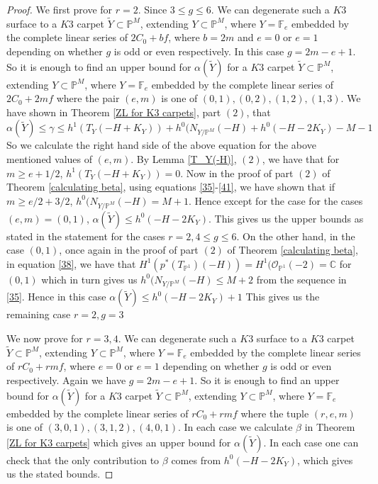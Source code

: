 \documentclass[11pt,twoside]{amsart}
\theoremstyle{plain}
\numberwithin{equation}{section}
\theoremstyle{definition}
\begin{document}
\begin{proof}
We first prove for $r = 2$. Since $3 \leq g \leq 6$. We can degenerate such a $K3$ surface to a $K3$ carpet $\widetilde{Y} \subset \mathbb{P}^M$, extending $Y \subset \mathbb{P}^M$, where $Y = \mathbb{F}_e$ embedded by the complete linear series of $2C_0+bf$, where $b = 2m$ and $e = 0$ or $e = 1$ depending on whether $g$ is odd or even respectively. In this case $g = 2m-e+1$. So it is enough to find an upper bound for $\alpha(\widetilde{Y})$ for a $K3$ carpet $\widetilde{Y} \subset \mathbb{P}^M$, extending $Y \subset \mathbb{P}^M$, where $Y = \mathbb{F}_e$ embedded by the complete linear series of $2C_0+2mf$ where the pair $(e,m)$ is one of $(0,1), (0,2), (1,2), (1,3)$. We have shown in Theorem \ref{ZL for K3 carpets}, part $(2)$, that $$\alpha(\widetilde{Y})  \leq  \gamma \leq h^1(T_Y(-H+K_Y))+h^0(N_{Y/\mathbb{P}^M}(-H)+h^0(-H-2K_Y)-M-1 $$
So we calculate the right hand side of the above equation for the above mentioned values of $(e,m)$. By Lemma \ref{T_Y(-H)}, $(2)$, we have that for $m \geq e+1/2$, $h^1(T_Y(-H+K_Y)) = 0$. Now in the proof of part $(2)$ of Theorem \ref{calculating beta}, using equations \ref{35}-\ref{41}, we have shown that if $m \geq e/2+3/2$, $h^0(N_{Y/\mathbb{P}^M}(-H) = M+1$. Hence except for the case for the cases $(e,m) = (0,1)$, $\alpha(\widetilde{Y}) \leq h^0(-H-2K_Y)$. This gives us the upper bounds as stated in the statement for the cases $r = 2, 4 \leq g \leq 6$. On the other hand, in the case $(0,1)$, once again in the proof of part $(2)$ of Theorem \ref{calculating beta}, in equation \ref{38}, we have that $H^1(p^*(T_{\mathbb{P}^1})(-H)) = H^1(\mathcal{O}_{\mathbb{P}^1}(-2) = \mathbb{C}$ for $(0,1)$ 
which in turn gives us $h^0(N_{Y/\mathbb{P}^M}(-H) \leq M+2$ 
from the sequence in \ref{35}. Hence in this case $\alpha(\widetilde{Y}) \leq h^0(-H-2K_Y)+1$ 
This gives us the remaining case $r = 2, g = 3$ 

We now prove for $r = 3,4$. We can degenerate such a $K3$ surface to a $K3$ carpet $\widetilde{Y} \subset \mathbb{P}^M$, extending $Y \subset \mathbb{P}^M$, where $Y = \mathbb{F}_e$ embedded by the complete linear series of $rC_0+rmf$, where $e = 0$ or $e = 1$ depending on whether $g$ is odd or even respectively. Again we have $g = 2m-e+1$. So it is enough to find an upper bound for $\alpha(\widetilde{Y})$ for a $K3$ carpet $\widetilde{Y} \subset \mathbb{P}^M$, extending $Y \subset \mathbb{P}^M$, where $Y = \mathbb{F}_e$ embedded by the complete linear series of $rC_0+rmf$ where the tuple $(r,e,m)$ is one of $(3,0,1), (3,1,2), (4,0,1)$. In each case we calculate $\beta$ in Theorem \ref{ZL for K3 carpets} which gives an upper bound for $\alpha(\widetilde{Y})$. In each case 
one can check that the only contribution to $\beta$ comes from $h^0(-H-2K_Y)$, which gives us the stated bounds. 
\end{proof}
\end{document}
